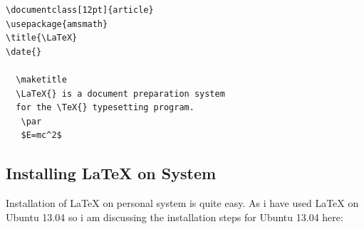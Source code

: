 \begin{verbatim}
\documentclass[12pt]{article}
\usepackage{amsmath}
\title{\LaTeX}
\date{}

  \maketitle 
  \LaTeX{} is a document preparation system 
  for the \TeX{} typesetting program.
   \par 
   $E=mc^2$

\end{verbatim}

\subsection{Installing \LaTeX{} on System}
Installation of \LaTeX{} on personal system is quite easy. As i have used \LaTeX{} on Ubuntu 13.04 so i am discussing the installation steps for Ubuntu 13.04 here:
